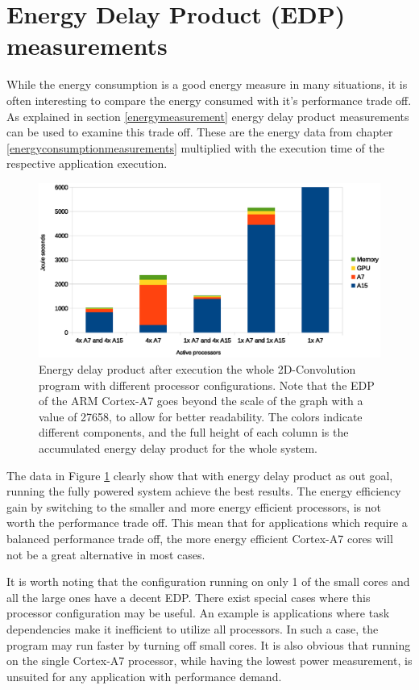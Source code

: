\section{Energy Delay Product (EDP) measurements} \label{EDP}
While the energy consumption is a good energy measure in many situations, it is often interesting to compare the energy consumed with it's performance trade off.
As explained in section \ref{energymeasurement} energy delay product measurements can be used to examine this trade off.
These are the energy data from chapter \ref{energyconsumptionmeasurements} multiplied with the execution time of the respective application execution.

\begin{figure}[H]
  \centering
  \includegraphics[width=160mm]{fig/EDP-configurations.eps}
  \caption{Energy delay product after execution the whole 2D-Convolution program with different processor configurations. Note that the EDP of the ARM Cortex-A7 goes beyond the scale of the graph with a value of 27658, to allow for better readability. The colors indicate different components, and the full height of each column is the accumulated energy delay product for the whole system.\label{EDP-graph}}
\end{figure}

The data in Figure \ref{EDP-graph} clearly show that with energy delay product as out goal, running the fully powered system achieve the best results.
The energy efficiency gain by switching to the smaller and more energy efficient processors, is not worth the performance trade off.
This mean that for applications which require a balanced performance trade off, the more energy efficient Cortex-A7 cores will not be a great alternative in most cases.

It is worth noting that the configuration running on only 1 of the small cores and all the large ones have a decent EDP.
There exist special cases where this processor configuration may be useful.
An example is applications where task dependencies make it inefficient to utilize all processors.
In such a case, the program may run faster by turning off small cores.
It is also obvious that running on the single Cortex-A7 processor, while having the lowest power measurement, is unsuited for any application with performance demand.

